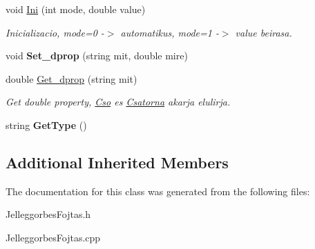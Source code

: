 \begin{DoxyCompactItemize}
\hypertarget{class_jelleggorbes_fojtas_a6e095b972116dd9b3dd0635dbbd4edb9}{}\label{class_jelleggorbes_fojtas_a6e095b972116dd9b3dd0635dbbd4edb9} 
void \hyperlink{class_jelleggorbes_fojtas_a6e095b972116dd9b3dd0635dbbd4edb9}{Ini} (int mode, double value)
\begin{DoxyCompactList}\small\item\em Inicializacio, mode=0 -\/$>$ automatikus, mode=1 -\/$>$ value beirasa. \end{DoxyCompactList}\item 
\hypertarget{class_jelleggorbes_fojtas_a1af41ea01aa004c5c709fed5760f1de1}{}\label{class_jelleggorbes_fojtas_a1af41ea01aa004c5c709fed5760f1de1} 
void {\bfseries Set\+\_\+dprop} (string mit, double mire)
\item 
\hypertarget{class_jelleggorbes_fojtas_ab5e5487da5f674affde45438021c0967}{}\label{class_jelleggorbes_fojtas_ab5e5487da5f674affde45438021c0967} 
double \hyperlink{class_jelleggorbes_fojtas_ab5e5487da5f674affde45438021c0967}{Get\+\_\+dprop} (string mit)
\begin{DoxyCompactList}\small\item\em Get double property, \hyperlink{class_cso}{Cso} es \hyperlink{class_csatorna}{Csatorna} akarja elulirja. \end{DoxyCompactList}\item 
\hypertarget{class_jelleggorbes_fojtas_a99692fcbf4be938803671901230f11ae}{}\label{class_jelleggorbes_fojtas_a99692fcbf4be938803671901230f11ae} 
string {\bfseries Get\+Type} ()
\end{DoxyCompactItemize}
\subsection*{Additional Inherited Members}


The documentation for this class was generated from the following files\+:\begin{DoxyCompactItemize}
\item 
Jelleggorbes\+Fojtas.\+h\item 
Jelleggorbes\+Fojtas.\+cpp\end{DoxyCompactItemize}
